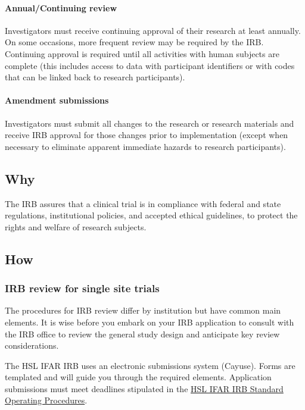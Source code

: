 \documentclass[]{book}
\theoremstyle{definition}
\theoremstyle{definition}
\theoremstyle{definition}
\theoremstyle{remark}
\begin{document}
\paragraph{Annual/Continuing review}\label{annualcontinuing-review}

Investigators must receive continuing approval of their research at
least annually. On some occasions, more frequent review may be required
by the IRB. Continuing approval is required until all activities with
human subjects are complete (this includes access to data with
participant identifiers or with codes that can be linked back to
research participants).

\paragraph{Amendment submissions}\label{amendment-submissions}

Investigators must submit all changes to the research or research
materials and receive IRB approval for those changes prior to
implementation (except when necessary to eliminate apparent immediate
hazards to research participants).

\subsection{Why}\label{why-5}

The IRB assures that a clinical trial is in compliance with federal and
state regulations, institutional policies, and accepted ethical
guidelines, to protect the rights and welfare of research subjects.

\subsection{How}\label{how-5}

\subsubsection{IRB review for single site
trials}\label{irb-review-for-single-site-trials}

The procedures for IRB review differ by institution but have common main
elements. It is wise before you embark on your IRB application to
consult with the IRB office to review the general study design and
anticipate key review considerations.

The HSL IFAR IRB uses an electronic submissions system (Cayuse). Forms
are templated and will guide you through the required elements.
Application submissions must meet deadlines stipulated in the
\href{http://thehslhub/~/media/HSLNet/Docs/IFAR/IRB/IRB_SOP.ashx}{HSL
IFAR IRB Standard Operating Procedures}.
\end{document}
